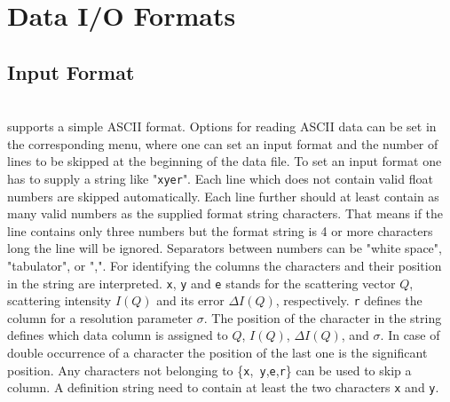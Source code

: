 \clearpage
\section{Data I/O Formats}

\subsection{Input Format} \hspace{1pt}\\

\SASfit supports a simple ASCII format. Options for reading ASCII
data can be set in the corresponding menu, where one can set an
input format and the number of lines to be skipped at the beginning
of the data file. To set an input format one has to supply a string
like "{\tt xyer}". Each line which does not contain valid float
numbers are skipped automatically. Each line further should at least
contain as many valid numbers as the supplied format string
characters. That means if the line contains only three numbers but
the format string is 4 or more characters long the line will be
ignored. Separators between numbers can be "white space",
"tabulator", or ",". For identifying the columns the characters and
their position in the string are interpreted. {\tt x}, {\tt y} and
{\tt e} stands for the scattering vector $Q$, scattering intensity
$I(Q)$ and its error $\Delta I(Q)$, respectively. {\tt r} defines
the column for a resolution parameter $\sigma$. The position of the
character in the string defines which data column is assigned to
$Q$, $I(Q)$, $\Delta I(Q)$, and $\sigma$. In case of double
occurrence of a character the position of the last one is the
significant position. Any characters not belonging to \{{\tt x},{\tt
y},{\tt e},{\tt r}\} can be used to skip a column. A definition
string need to contain
at least the two characters {\tt x} and {\tt y}. \\

